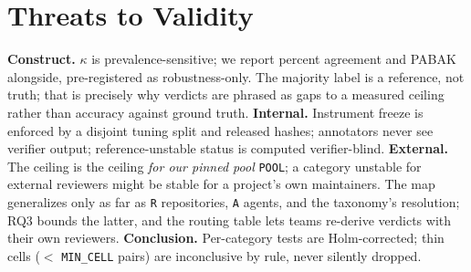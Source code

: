 \documentclass[conference]{IEEEtran}
\newcommand{\ph}[1]{\colorbox{yellow!35}{\texttt{\footnotesize #1}}}
\begin{document}
\section{Threats to Validity}\label{sec:threats}
\textbf{Construct.} $\kappa$ is prevalence-sensitive; we report percent
agreement and PABAK alongside, pre-registered as robustness-only. The majority
label is a reference, not truth; that is precisely why verdicts are phrased as
gaps to a measured ceiling rather than accuracy against ground truth.
\textbf{Internal.} Instrument freeze is enforced by a disjoint tuning split and
released hashes; annotators never see verifier output; reference-unstable
status is computed verifier-blind.
\textbf{External.} The ceiling is the ceiling \emph{for our pinned pool}
\ph{POOL}; a category unstable for external reviewers might be stable for a
project's own maintainers. The map generalizes only as far as \ph{R}
repositories, \ph{A} agents, and the taxonomy's resolution; RQ3 bounds the
latter, and the routing table lets teams re-derive verdicts with their own
reviewers.
\textbf{Conclusion.} Per-category tests are Holm-corrected; thin cells
($<$ \ph{MIN\_CELL} pairs) are inconclusive by rule, never silently dropped.

\end{document}
